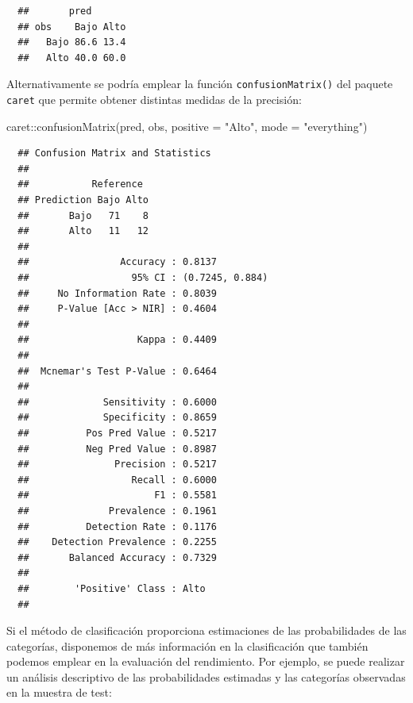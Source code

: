 \documentclass[
]{book}
\newenvironment{Shaded}{\begin{snugshade}}{\end{snugshade}}
\newcommand{\AttributeTok}[1]{\textcolor[rgb]{0.77,0.63,0.00}{#1}}
\newcommand{\FunctionTok}[1]{\textcolor[rgb]{0.00,0.00,0.00}{#1}}
\newcommand{\NormalTok}[1]{#1}
\newcommand{\SpecialCharTok}[1]{\textcolor[rgb]{0.00,0.00,0.00}{#1}}
\newcommand{\StringTok}[1]{\textcolor[rgb]{0.31,0.60,0.02}{#1}}
\theoremstyle{break}
\theoremstyle{nonumberplain}
\begin{document}
\begin{verbatim}
  ##       pred
  ## obs    Bajo Alto
  ##   Bajo 86.6 13.4
  ##   Alto 40.0 60.0
\end{verbatim}

Alternativamente se podría emplear la función \texttt{confusionMatrix()} del paquete \texttt{caret} que permite obtener distintas medidas de la precisión:

\begin{Shaded}
\begin{Highlighting}[]
\NormalTok{caret}\SpecialCharTok{::}\FunctionTok{confusionMatrix}\NormalTok{(pred, obs, }\AttributeTok{positive =} \StringTok{"Alto"}\NormalTok{, }\AttributeTok{mode =} \StringTok{"everything"}\NormalTok{)}
\end{Highlighting}
\end{Shaded}

\begin{verbatim}
  ## Confusion Matrix and Statistics
  ## 
  ##           Reference
  ## Prediction Bajo Alto
  ##       Bajo   71    8
  ##       Alto   11   12
  ##                                          
  ##                Accuracy : 0.8137         
  ##                  95% CI : (0.7245, 0.884)
  ##     No Information Rate : 0.8039         
  ##     P-Value [Acc > NIR] : 0.4604         
  ##                                          
  ##                   Kappa : 0.4409         
  ##                                          
  ##  Mcnemar's Test P-Value : 0.6464         
  ##                                          
  ##             Sensitivity : 0.6000         
  ##             Specificity : 0.8659         
  ##          Pos Pred Value : 0.5217         
  ##          Neg Pred Value : 0.8987         
  ##               Precision : 0.5217         
  ##                  Recall : 0.6000         
  ##                      F1 : 0.5581         
  ##              Prevalence : 0.1961         
  ##          Detection Rate : 0.1176         
  ##    Detection Prevalence : 0.2255         
  ##       Balanced Accuracy : 0.7329         
  ##                                          
  ##        'Positive' Class : Alto           
  ## 
\end{verbatim}

Si el método de clasificación proporciona estimaciones de las probabilidades de las categorías, disponemos de más información en la clasificación que también podemos emplear en la evaluación del rendimiento.
Por ejemplo, se puede realizar un análisis descriptivo de las probabilidades estimadas y las categorías observadas en la muestra de test:
\end{document}
